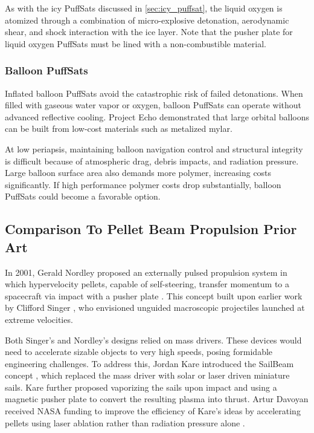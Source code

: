 \documentclass{article}
\begin{document}
As with the icy PuffSats discussed in \autoref{sec:icy_puffsat}, the liquid oxygen is atomized through a combination of micro-explosive detonation, aerodynamic shear, and shock interaction with the ice layer.  Note that the pusher plate for liquid oxygen PuffSats must be lined with a non-combustible material.

\subsubsection{Balloon PuffSats}
Inflated balloon PuffSats avoid the catastrophic risk of failed detonations.  When filled with gaseous water vapor or oxygen, balloon PuffSats can operate without advanced reflective cooling. Project Echo \cite{JPL_EchoQL2010} demonstrated that large orbital balloons can be built from low-cost materials such as metalized mylar.

At low periapsis, maintaining balloon navigation control and structural integrity is difficult because of  atmospheric drag, debris impacts, and radiation pressure. Large balloon surface area also demands more polymer, increasing costs significantly. If high performance polymer costs drop substantially, balloon PuffSats could become a favorable option.

\subsection{Comparison To Pellet Beam Propulsion Prior Art}
In 2001, Gerald Nordley proposed an externally pulsed propulsion system in which hypervelocity pellets, capable of self-steering, transfer momentum to a spacecraft via impact with a pusher plate \cite{nordley2001interstellar}. This concept built upon earlier work by Clifford Singer \cite{singer1979interstellar}, who envisioned unguided macroscopic projectiles launched at extreme velocities. 

Both Singer’s and Nordley’s designs relied on mass drivers.  These devices would need to accelerate sizable objects to very high speeds, posing formidable engineering challenges. To address this, Jordan Kare introduced the SailBeam concept \cite{kare2001sailbeam}, which replaced the mass driver with solar or laser driven miniature sails. Kare further proposed vaporizing the sails upon impact and using a magnetic pusher plate to convert the resulting plasma into thrust.   Artur Davoyan received NASA funding to improve the efficiency of Kare's ideas by accelerating pellets using laser ablation rather than radiation pressure alone \cite{davoyan2023pelletbeam}.
\end{document}
